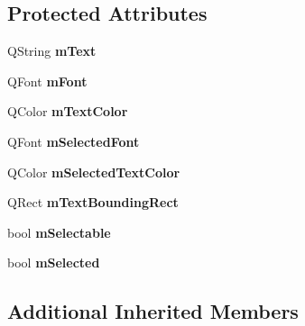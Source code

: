 \subsection*{Protected Attributes}
\begin{DoxyCompactItemize}
\item 
Q\+String {\bfseries m\+Text}\hypertarget{class_q_c_p_plot_title_a0d961bfac1211d59d3b0bc30d35f6379}{}\label{class_q_c_p_plot_title_a0d961bfac1211d59d3b0bc30d35f6379}

\item 
Q\+Font {\bfseries m\+Font}\hypertarget{class_q_c_p_plot_title_ad9e2c2a2e941f3444cb692a51df0df62}{}\label{class_q_c_p_plot_title_ad9e2c2a2e941f3444cb692a51df0df62}

\item 
Q\+Color {\bfseries m\+Text\+Color}\hypertarget{class_q_c_p_plot_title_a5d7f834d6522c1a72fb0682c0b7ebe13}{}\label{class_q_c_p_plot_title_a5d7f834d6522c1a72fb0682c0b7ebe13}

\item 
Q\+Font {\bfseries m\+Selected\+Font}\hypertarget{class_q_c_p_plot_title_a95003186c39bbab902873a8ef4cbb547}{}\label{class_q_c_p_plot_title_a95003186c39bbab902873a8ef4cbb547}

\item 
Q\+Color {\bfseries m\+Selected\+Text\+Color}\hypertarget{class_q_c_p_plot_title_a8b9760e62af92814c4effdd7ad69c5f9}{}\label{class_q_c_p_plot_title_a8b9760e62af92814c4effdd7ad69c5f9}

\item 
Q\+Rect {\bfseries m\+Text\+Bounding\+Rect}\hypertarget{class_q_c_p_plot_title_a7178a0f6c1e633c144c17b4de4e0b840}{}\label{class_q_c_p_plot_title_a7178a0f6c1e633c144c17b4de4e0b840}

\item 
bool {\bfseries m\+Selectable}\hypertarget{class_q_c_p_plot_title_aadefb5e2b19b1cc7deda0a55ec747884}{}\label{class_q_c_p_plot_title_aadefb5e2b19b1cc7deda0a55ec747884}

\item 
bool {\bfseries m\+Selected}\hypertarget{class_q_c_p_plot_title_afef1342a20f5ca985a20b9cfdc03d815}{}\label{class_q_c_p_plot_title_afef1342a20f5ca985a20b9cfdc03d815}

\end{DoxyCompactItemize}
\subsection*{Additional Inherited Members}


